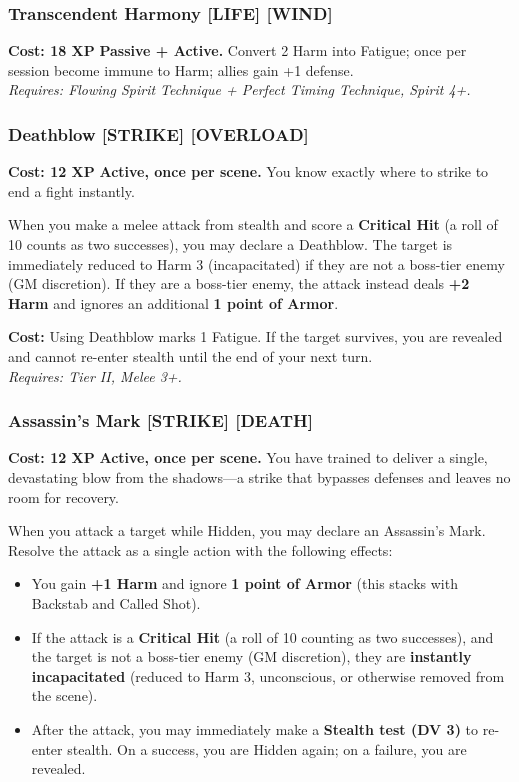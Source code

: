 \documentclass[12pt,a4paper]{book}
\begin{document}
\subsubsection*{Transcendent Harmony \textnormal{[LIFE] [WIND]}}
\label{talent:transcendent-harmony}
\textbf{Cost: 18 XP} \textbf{Passive + Active.} Convert 2 Harm into Fatigue; once per session become immune to Harm; allies gain +1 defense. \\
\textit{Requires: Flowing Spirit Technique + Perfect Timing Technique, Spirit 4+.}

\subsubsection*{Deathblow \textnormal{[STRIKE] [OVERLOAD]}}
\label{talent:deathblow}
\textbf{Cost: 12 XP} \textbf{Active, once per scene.} You know exactly where to strike to end a fight instantly.

When you make a melee attack from stealth and score a \textbf{Critical Hit} (a roll of 10 counts as two successes), you may declare a Deathblow. The target is immediately reduced to Harm 3 (incapacitated) if they are not a boss-tier enemy (GM discretion). If they are a boss-tier enemy, the attack instead deals \textbf{+2 Harm} and ignores an additional \textbf{1 point of Armor}.

\textbf{Cost:} Using Deathblow marks 1 Fatigue. If the target survives, you are revealed and cannot re-enter stealth until the end of your next turn. \\
\textit{Requires: Tier II, Melee 3+.}

\subsubsection*{Assassin's Mark \textnormal{[STRIKE] [DEATH]}}
\label{talent:assassins-mark}
\textbf{Cost: 12 XP} \textbf{Active, once per scene.} You have trained to deliver a single, devastating blow from the shadows---a strike that bypasses defenses and leaves no room for recovery.

When you attack a target while Hidden, you may declare an Assassin's Mark. Resolve the attack as a single action with the following effects:
\begin{itemize}
    \item You gain \textbf{+1 Harm} and ignore \textbf{1 point of Armor} (this stacks with Backstab and Called Shot).
    \item If the attack is a \textbf{Critical Hit} (a roll of 10 counting as two successes), and the target is not a boss-tier enemy (GM discretion), they are \textbf{instantly incapacitated} (reduced to Harm 3, unconscious, or otherwise removed from the scene).
    \item After the attack, you may immediately make a \textbf{Stealth test (DV 3)} to re-enter stealth. On a success, you are Hidden again; on a failure, you are revealed.
\end{itemize}
\end{document}
